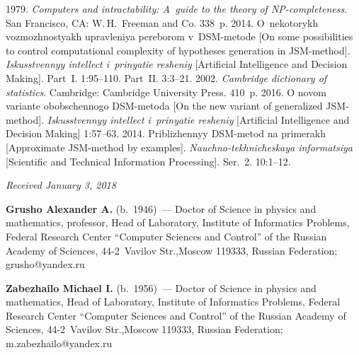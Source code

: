 \begin{multicols}{2}
{{\begin{thebibliography}{99}
      1979. \textit{Computers and intractability: A~guide 
to the theory of NP-completeness}. San Francisco, CA: W.\,H.~Freeman and Co. 338~p.
      2014. O~nekotorykh vozmozhnostyakh upravleniya pereborom 
v~DSM-metode [On some possibilities to control computational complexity of hypotheses generation 
in JSM-method]. \textit{Iskusstvennyy intellect i~pri\-nya\-tie resheniy} [Artificial Intelligence and 
Decision Making]. Part~I. 1:95--110. Part~II. 3:3--21.
      2002. \textit{Cambridge dictionary of statistics}. Cambridge: Cambridge 
University Press. 410~p.
      2016. O novom variante obobschennogo  
DSM-metoda [On the new variant of generalized JSM-method]. \textit{Iskusstvennyy intellect 
i~prinyatie resheniy} [Artificial Intelligence and Decision Making] 1:57--63.
      2014. Priblizhennyy DSM-metod na primerakh [Approximate  
JSM-method by examples]. \textit{Nauchno-tekhnicheskaya informatsiya} [Scientific and Technical 
Information Processing]. Ser.~2. 10:1--12.
\end{thebibliography}

 }
 }

\end{multicols}

\vspace*{-6pt}

\hfill{\small\textit{Received January 3, 2018}}

  
  
  \Contr
  
\noindent
\textbf{Grusho Alexander A.} (b.\ 1946)~--- Doctor of Science in physics and 
mathematics, professor, Head of Laboratory, Institute of Informatics Problems, 
Federal Research Center ``Computer Sciences and Control'' of the Russian 
Academy of Sciences, 44-2~Vavilov Str.,Moscow 119333, Russian Federation; 
\mbox{grusho@yandex.ru}

\vspace*{3pt}

\noindent
\textbf{Zabezhailo Michael I.} (b.\ 1956)~--- Doctor of Science in physics and 
mathematics, Head of Laboratory, Institute of Informatics Problems, Federal 
Research Center ``Computer Sciences and Control'' of the Russian Academy of 
Sciences, 44-2~Vavilov Str.,Moscow 119333, Russian Federation; 
\mbox{m.zabezhailo@yandex.ru}


